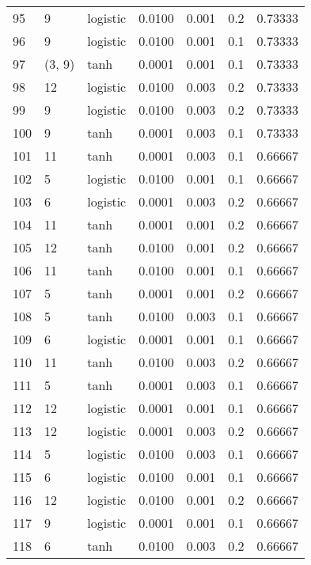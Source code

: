\begin{tabular}{lllrrrr}
95  &           9 &  logistic &  0.0100 &  0.001 &  0.2 &   0.73333 \\
96  &           9 &  logistic &  0.0100 &  0.001 &  0.1 &   0.73333 \\
97  &      (3, 9) &      tanh &  0.0001 &  0.001 &  0.1 &   0.73333 \\
98  &          12 &  logistic &  0.0100 &  0.003 &  0.2 &   0.73333 \\
99  &           9 &  logistic &  0.0100 &  0.003 &  0.2 &   0.73333 \\
100 &           9 &      tanh &  0.0001 &  0.003 &  0.1 &   0.73333 \\
101 &          11 &      tanh &  0.0001 &  0.003 &  0.1 &   0.66667 \\
102 &           5 &  logistic &  0.0100 &  0.001 &  0.1 &   0.66667 \\
103 &           6 &  logistic &  0.0001 &  0.003 &  0.2 &   0.66667 \\
104 &          11 &      tanh &  0.0001 &  0.001 &  0.2 &   0.66667 \\
105 &          12 &      tanh &  0.0100 &  0.001 &  0.2 &   0.66667 \\
106 &          11 &      tanh &  0.0100 &  0.001 &  0.1 &   0.66667 \\
107 &           5 &      tanh &  0.0001 &  0.001 &  0.2 &   0.66667 \\
108 &           5 &      tanh &  0.0100 &  0.003 &  0.1 &   0.66667 \\
109 &           6 &  logistic &  0.0001 &  0.001 &  0.1 &   0.66667 \\
110 &          11 &      tanh &  0.0100 &  0.003 &  0.2 &   0.66667 \\
111 &           5 &      tanh &  0.0001 &  0.003 &  0.1 &   0.66667 \\
112 &          12 &  logistic &  0.0001 &  0.001 &  0.1 &   0.66667 \\
113 &          12 &  logistic &  0.0001 &  0.003 &  0.2 &   0.66667 \\
114 &           5 &  logistic &  0.0100 &  0.003 &  0.1 &   0.66667 \\
115 &           6 &  logistic &  0.0100 &  0.001 &  0.1 &   0.66667 \\
116 &          12 &  logistic &  0.0100 &  0.001 &  0.2 &   0.66667 \\
117 &           9 &  logistic &  0.0001 &  0.001 &  0.1 &   0.66667 \\
118 &           6 &      tanh &  0.0100 &  0.003 &  0.2 &   0.66667 \\

\end{tabular}
